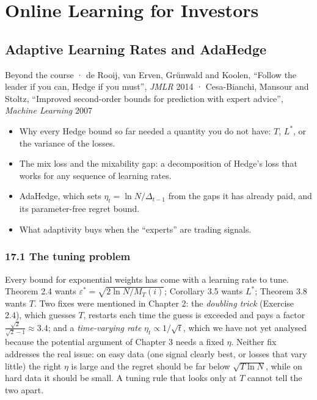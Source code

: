\documentclass[11pt,a4paper,openany]{book}
\newcommand{\eps}{\varepsilon}
\newcommand{\thepartblurb}{}
\newcommand{\chapsource}[1]{{\small\sffamily\color{muted}#1\par}\medskip}
\begin{document}
\def\thepartblurb{Two chapters that take the theory to the trading desk: learning rates that tune themselves, and what regret bounds do and do not promise a portfolio.}\part{Online Learning for Investors}\label{part7}

\chapter[Adaptive learning rates and AdaHedge]{Adaptive Learning Rates and AdaHedge}\label{ch17}
\chapsource{Beyond the course · de Rooij, van Erven, Grünwald and Koolen, ``Follow the leader if you can, Hedge if you must'', \emph{JMLR} 2014 · Cesa-Bianchi, Mansour and Stoltz, ``Improved second-order bounds for prediction with expert advice'', \emph{Machine Learning} 2007}

\begin{goals}
\begin{itemize}
\item Why every Hedge bound so far needed a quantity you do not have: $T$, $L^*$, or the variance of the losses.
\item The mix loss and the mixability gap: a decomposition of Hedge's loss that works for any sequence of learning rates.
\item AdaHedge, which sets $\eta_t=\ln N/\Delta_{t-1}$ from the gaps it has already paid, and its parameter-free regret bound.
\item What adaptivity buys when the ``experts'' are trading signals.
\end{itemize}
\end{goals}

\section*{17.1 The tuning problem}\label{ch17-tuning}

Every bound for exponential weights has come with a learning rate to tune. Theorem 2.4 wants $\eps^*=\sqrt{2\ln N/M_T(i)}$; Corollary 3.5 wants $L^*$; Theorem 3.8 wants $T$. Two fixes were mentioned in Chapter 2: the \emph{doubling trick} (Exercise 2.4), which guesses $T$, restarts each time the guess is exceeded and pays a factor $\frac{\sqrt2}{\sqrt2-1}\approx3.4$; and a \emph{time-varying rate} $\eta_t\propto1/\sqrt t$, which we have not yet analysed because the potential argument of Chapter 3 needs a fixed $\eta$. Neither fix addresses the real issue: on easy data (one signal clearly best, or losses that vary little) the right $\eta$ is large and the regret should be far below $\sqrt{T\ln N}$, while on hard data it should be small. A tuning rule that looks only at $T$ cannot tell the two apart.
\end{document}
